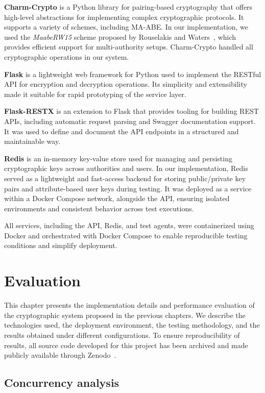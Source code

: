 \documentclass[cic,tc,english]{iiufrgs}
\numberwithin{algorithm}{chapter}
\begin{document}
            \textbf{Charm-Crypto} is a Python library for pairing-based cryptography that offers high-level abstractions for implementing complex cryptographic protocols. It supports a variety of schemes, including MA-ABE. In our implementation, we used the \emph{MaabeRW15} scheme proposed by Rouselakis and Waters~\citep{rouselakis2015efficient}, which provides efficient support for multi-authority setups. Charm-Crypto handled all cryptographic operations in our system.

            \textbf{Flask} is a lightweight web framework for Python used to implement the RESTful API for encryption and decryption operations. Its simplicity and extensibility made it suitable for rapid prototyping of the service layer.

            \textbf{Flask-RESTX} is an extension to Flask that provides tooling for building REST APIs, including automatic request parsing and Swagger documentation support. It was used to define and document the API endpoints in a structured and maintainable way.

            \textbf{Redis} is an in-memory key-value store used for managing and persisting cryptographic keys across authorities and users. In our implementation, Redis served as a lightweight and fast-access backend for storing public/private key pairs and attribute-based user keys during testing. It was deployed as a service within a Docker Compose network, alongside the API, ensuring isolated environments and consistent behavior across test executions.

            All services, including the API, Redis, and test agents, were containerized using Docker and orchestrated with Docker Compose to enable reproducible testing conditions and simplify deployment.

\chapter{Evaluation}
    \label{chap:evaluation}
    This chapter presents the implementation details and performance evaluation of the cryptographic system proposed in the previous chapters. We describe the technologies used, the deployment environment, the testing methodology, and the results obtained under different configurations. To ensure reproducibility of results, all source code developed for this project has been archived and made publicly available through Zenodo~\citep{maabeflask}.

        \section{Concurrency analysis}
        \label{subsec:phase1_concurrency}
\end{document}
